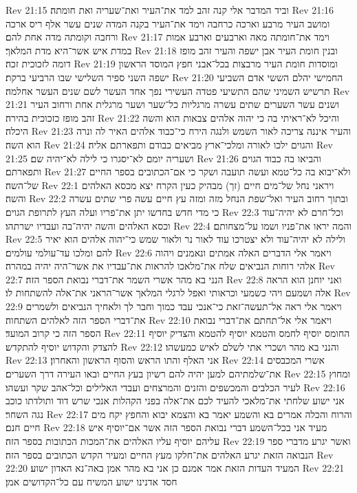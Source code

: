 Rev 21:15  וביד המדבר אלי קנה זהב למד את־העיר ואת־שעריה ואת חומתה׃
Rev 21:16  ומושב העיר מרבע וארכה כרחבה וימד את־העיר בקנה המדה שנים עשר אלף ריס ארכה ורחבה וקומתה מדה אחת להם׃
Rev 21:17  וימד את־חומתה מאה וארבעים וארבע אמות במדת איש אשר־היא מדת המלאך׃
Rev 21:18  ובנין חומת העיר אבן ישפה והעיר זהב מופז דומה לזכוכית זכה׃
Rev 21:19  ומוסדות חומת העיר מרבצות בכל־אבני חפץ המוסד הראשון ישפה השני ספיר השלישי שבו הרביעי ברקת׃
Rev 21:20  החמישי יהלם הששי אדם השביעי תרשיש השמיני שהם התשיעי פטדה העשירי נפך אחד העשר לשם שנים העשר אחלמה׃
Rev 21:21  ושנים עשר השערים שתים עשרה מרגליות כל־שער ושער מרגלית אחת ורחוב העיר זהב מופז כזכוכית בהירה׃
Rev 21:22  והיכל לא־ראיתי בה כי יהוה אלהים צבאות הוא והשה היכלה׃
Rev 21:23  והעיר איננה צריכה לאור השמש ולנגה הירח כי־כבוד אלהים האיר לה ונרה הוא השה׃
Rev 21:24  והגוים ילכו לאורה ומלכי־ארץ מביאים כבודם ותפארתם אליה׃
Rev 21:25  ושעריה יומם לא־יסגרו כי לילה לא־יהיה שם׃
Rev 21:26  והביאו בה כבוד הגוים ותפארתם׃
Rev 21:27  ולא־יבוא בה כל־טמא ועשה תועבה ושקר כי אם־הכתובים בספר החיים של־השה׃
Rev 22:1  ויראני נחל של־מים חיים (זך) מבהיק כעין הקרח יצא מכסא האלהים והשה׃
Rev 22:2  ובתוך רחוב העיר ואל־שפת הנחל מזה ומזה עץ חיים עשה פרי שתים עשרה כי מדי חדש בחדשו יתן את־פריו ועלה העץ לתרופת הגוים׃
Rev 22:3  וכל־חרם לא יהיה־עוד וכסא האלהים והשה יהיה־בה ועבדיו ישרתהו׃
Rev 22:4  והמה יראו את־פניו ושמו על־מצחותם׃
Rev 22:5  ולילה לא יהיה־עוד ולא יצטרכו עוד לאור נר ולאור שמש כי־יהוה אלהים הוא יאיר להם ומלכו עד־עולמי עולמים׃
Rev 22:6  ויאמר אלי הדברים האלה אמתים ונאמנים ויהוה אלהי רוחות הנביאים שלח את־מלאכו להראות את־עבדיו את אשר־היה יהיה במהרה׃
Rev 22:7  הנני בא מהר אשרי השמר את־דברי נבואת הספר הזה׃
Rev 22:8  ואני יוחנן הוא הראה אלה ושמעם ויהי כשמעי וכראותי ואפל לרגלי המלאך אשר־הראני את־אלה להשתחות לו׃
Rev 22:9  ויאמר אלי ראה אל־תעשה־זאת כי־אנכי עבד כמוך וחבר לך ולאחיך הנביאים ולשמרים את־דברי הספר הזה לאלהים השתחוה׃
Rev 22:10  ויאמר אלי אל־תחתם את־דברי נבואת הספר הזה כי קרוב המועד׃
Rev 22:11  החומס יוסיף לחמס והטמא יוסיף להטמא והצדיק יוסיף להצדק והקדוש יוסיף להתקדש׃
Rev 22:12  והנני בא מהר ושכרי אתי לשלם לאיש כמעשהו׃
Rev 22:13  אני האלף והתו הראש והסוף הראשון והאחרון׃
Rev 22:14  אשרי המכבסים את־שלמתיהם למען יהיה להם רשיון בעץ החיים ובאו העירה דרך השערים׃
Rev 22:15  ומחוץ לעיר הכלבים והמכשפים והזנים והמרצחים ועבדי האלילים וכל־אהב שקר ועשהו׃
Rev 22:16  אני ישוע שלחתי את־מלאכי להעיד לכם את־אלה בפני הקהלות אנכי שרש דוד ותולדתו כוכב נגה השחר׃
Rev 22:17  והרוח והכלה אמרים בא והשמע יאמר בא והצמא יבוא והחפץ יקח מים חיים חנם׃
Rev 22:18  מעיד אני בכל־השמע דברי נבואת הספר הזה אשר אם־יוסיף איש עליהם יוסיף עליו האלהים את־המכות הכתובות בספר הזה׃
Rev 22:19  ואשר יגרע מדברי ספר הנבואה הזאת יגרע האלהים את־חלקו מעץ החיים ומעיר הקדש הכתובים בספר הזה׃
Rev 22:20  המעיד העדות הזאת אמר אמנם כן אני בא מהר אמן באה־נא האדון ישוע׃
Rev 22:21  חסד אדנינו ישוע המשיח עם כל־הקדושים אמן׃


